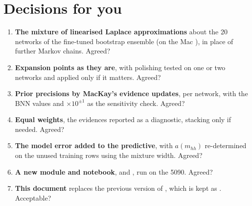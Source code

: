 \section{Decisions for you}
\label{sec:decisions}

\begin{keyidea}
\begin{enumerate}
  \item \textbf{The mixture of linearised Laplace approximations} about the 20 networks of
    the fine-tuned bootstrap ensemble (on the Mac ),
    in place of further Markov chains. Agreed?
  \item \textbf{Expansion points as they are}, with polishing tested on one or two networks
    and applied only if it matters. Agreed?
  \item \textbf{Prior precisions by MacKay's evidence updates}, per network, with the BNN
    values and $\times10^{\pm1}$ as the sensitivity check. Agreed?
  \item \textbf{Equal weights}, the evidences reported as a diagnostic, stacking only if
    needed. Agreed?
  \item \textbf{The model error added to the predictive}, with $a(m_{hh})$ re-determined on
    the unused training rows using the mixture width. Agreed?
  \item \textbf{A new module and notebook},  and
    , run on the 5090. Agreed?
  \item \textbf{This document} replaces the previous version of ,
    which is kept as . Acceptable?
\end{enumerate}
\end{keyidea}

